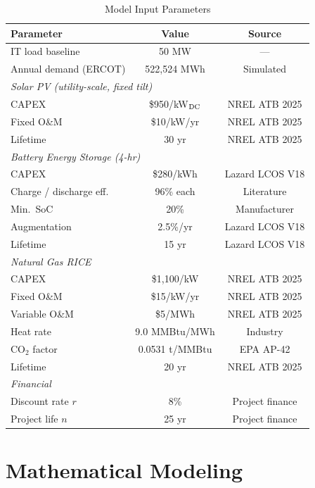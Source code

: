\documentclass[conference]{IEEEtran}
\begin{document}
\begin{table}[htbp]
\caption{Model Input Parameters}
\label{tab:inputs}
\begin{center}
\begin{tabular}{|l|c|c|}
\hline
\textbf{Parameter} & \textbf{Value} & \textbf{Source} \\
\hline
IT load baseline & 50 MW & --- \\
Annual demand (ERCOT) & 522,524 MWh & Simulated \\
\hline
\multicolumn{3}{|l|}{\textit{Solar PV (utility-scale, fixed tilt)}} \\
\hline
CAPEX & \$950/kW$_{\rm DC}$ & NREL ATB 2025 \\
Fixed O\&M & \$10/kW/yr & NREL ATB 2025 \\
Lifetime & 30 yr & NREL ATB 2025 \\
\hline
\multicolumn{3}{|l|}{\textit{Battery Energy Storage (4-hr)}} \\
\hline
CAPEX & \$280/kWh & Lazard LCOS V18 \\
Charge / discharge eff. & 96\% each & Literature \\
Min.\ SoC & 20\% & Manufacturer \\
Augmentation & 2.5\%/yr & Lazard LCOS V18 \\
Lifetime & 15 yr & Lazard LCOS V18 \\
\hline
\multicolumn{3}{|l|}{\textit{Natural Gas RICE}} \\
\hline
CAPEX & \$1,100/kW & NREL ATB 2025 \\
Fixed O\&M & \$15/kW/yr & NREL ATB 2025 \\
Variable O\&M & \$5/MWh & NREL ATB 2025 \\
Heat rate & 9.0 MMBtu/MWh & Industry \\
CO$_2$ factor & 0.0531 t/MMBtu & EPA AP-42 \\
Lifetime & 20 yr & NREL ATB 2025 \\
\hline
\multicolumn{3}{|l|}{\textit{Financial}} \\
\hline
Discount rate $r$ & 8\% & Project finance \\
Project life $n$ & 25 yr & Project finance \\
\hline
\end{tabular}
\end{center}
\end{table}

\section{Mathematical Modeling}
\label{sec:model}
\end{document}
